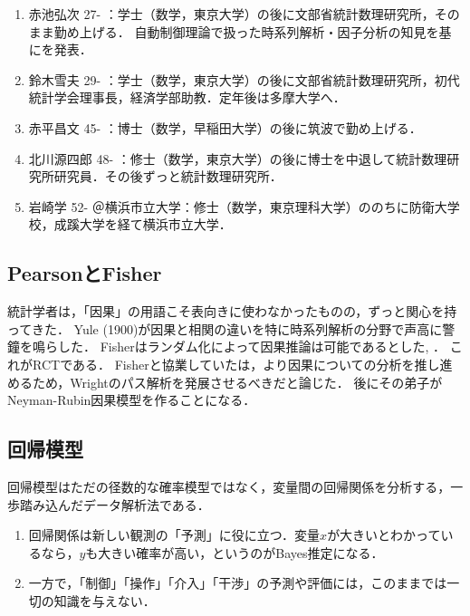\documentclass[uplatex,dvipdfmx]{jsreport}
\begin{document}
\begin{history}[日本の主な研究者]
\begin{description}
\begin{enumerate}
            \item 赤池弘次 27- ：学士（数学，東京大学）の後に文部省統計数理研究所，そのまま勤め上げる．
            自動制御理論で扱った時系列解析・因子分析の知見を基に\cite{Akaike74-AIC}を発表．
            \item 鈴木雪夫 29- ：学士（数学，東京大学）の後に文部省統計数理研究所，初代統計学会理事長，経済学部助教．定年後は多摩大学へ．
            \item 赤平昌文 45- ：博士（数学，早稲田大学）の後に筑波で勤め上げる．
            \item 北川源四郎 48- ：修士（数学，東京大学）の後に博士を中退して統計数理研究所研究員．その後ずっと統計数理研究所．
            \item 岩崎学 52- ＠横浜市立大学：修士（数学，東京理科大学）ののちに防衛大学校，成蹊大学を経て横浜市立大学．
        \end{enumerate}
    \end{description}
\end{history}

\subsection{PearsonとFisher}

\begin{tcolorbox}[colframe=ForestGreen, colback=ForestGreen!10!white,breakable,colbacktitle=ForestGreen!40!white,coltitle=black,fonttitle=\bfseries\sffamily,
    title=]
    統計学者は，「因果」の用語こそ表向きに使わなかったものの，ずっと関心を持ってきた\cite{Cox-Wermuth04-review}．
    Yule (1900)が因果と相関の違いを特に時系列解析の分野で声高に警鐘を鳴らした．
    Fisherはランダム化によって因果推論は可能であるとした\cite{Fisher26}, \cite{Fisher35-Design}．
    これがRCTである．
    Fisherと協業していた\cite{Cochran65}は，より因果についての分析を推し進めるため，Wrightのパス解析を発展させるべきだと論じた．
    後にその弟子がNeyman-Rubin因果模型を作ることになる．
\end{tcolorbox}

\subsection{回帰模型}

\begin{tcolorbox}[colframe=ForestGreen, colback=ForestGreen!10!white,breakable,colbacktitle=ForestGreen!40!white,coltitle=black,fonttitle=\bfseries\sffamily,
title=]
    回帰模型はただの径数的な確率模型ではなく，変量間の回帰関係を分析する，一歩踏み込んだデータ解析法である．
    \begin{enumerate}
        \item 回帰関係は新しい観測の「予測」に役に立つ．変量$x$が大きいとわかっているなら，$y$も大きい確率が高い，というのがBayes推定になる．
        \item 一方で，「制御」「操作」「介入」「干渉」の予測や評価には，このままでは一切の知識を与えない．
    \end{enumerate}
\end{tcolorbox}
\end{document}

